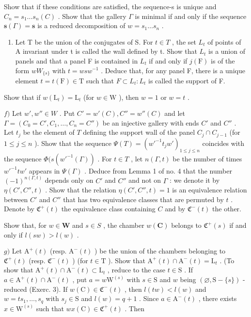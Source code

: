Show that if these conditions are satisfied, the sequence-s is unique and \(C_{n} = s_{1} \ldots s_{n}(C)\) . Show that the gallery \(\Gamma\) is minimal if and only if the sequence \(\mathbf{s}(\Gamma) = \mathbf{s}\) is a reduced decomposition of \(w = s_{1} \ldots s_{n}\) .

\begin{enumerate}
\def\labelenumi{\alph{enumi})}
\setcounter{enumi}{4}
\tightlist
\item
  Let T be the union of the conjugates of S. For \(t \in T\) , the set \(L_{t}\) of points of A invariant under t is called the wall defined by t. Show that \(L_{t}\) is a union of panels and that a panel F is contained in \(L_{t}\) if and only if \(j(\mathrm{F})\) is of the form \(wW_{\{s\}}\) with \(t = wsw^{-1}\) . Deduce that, for any panel F, there is a unique element \(t = t(\mathrm{F}) \in \mathrm{T}\) such that \(F \subset L_{t}: L_{t}\) is called the support of F.
\end{enumerate}

Show that if \(w(\mathrm{L}_t) = \mathrm{L}_t\) (for \(w \in \mathrm{W}\) ), then \(w = 1\) or \(w = t\) .

\(f)\) Let \(w', w'' \in W\) . Put \(C' = w'(C), C'' = w''(C)\) and let \(\Gamma = (C_0 = C', C_1, \ldots, C_n = C'')\) be an injective gallery with ends \(C'\) and \(C''\) . Let \(t_j\) be the element of \(T\) defining the support wall of the panel \(C_j \cap C_{j-1}\) (for \(1 \leqslant j \leqslant n\) ). Show that the sequence \(\Psi(T) = (w'^{-1} t_j w')_{1 \leqslant j \leqslant n}\) coincides with the sequence \(\Phi(s(w'^{-1}(\Gamma))\) . For \(t \in T\) , let \(n(\Gamma, t)\) be the number of times \(w'^{-1} tw'\) appears in \(\Psi(\Gamma)\) . Deduce from Lemma 1 of no. 4 that the number \((-1)^{n(\Gamma, t)}\) depends only on \(C'\) and \(C''\) and not on \(\Gamma\) : we denote it by \(\eta(C', C'', t)\) . Show that the relation \(\eta(C', C'', t) = 1\) is an equivalence relation between \(C'\) and \(C''\) that has two equivalence classes that are permuted by \(t\) . Denote by \(\mathfrak{C}^+(t)\) the equivalence class containing \(C\) and by \(\mathfrak{C}^-(t)\) the other.

Show that, for \(w \in \mathbf{W}\) and \(s \in S\) , the chamber \(w(\mathbf{C})\) belongs to \(\mathfrak{C}^+(s)\) if and only if \(l(sw) > l(w)\) .

\(g)\) Let \(\mathrm{A}^{+}(t)\) (resp. \(\mathrm{A}^{-}(t)\) ) be the union of the chambers belonging to \(\mathfrak{C}^{+}(t)\) (resp. \(\mathfrak{C}^{-}(t)\) ) (for \(t \in \mathrm{T}\) ). Show that \(\mathrm{A}^{+}(t) \cap \mathrm{A}^{-}(t) = \mathrm{L}_{t}\) . (To show that \(\mathrm{A}^{+}(t) \cap \mathrm{A}^{-}(t) \subset \mathrm{L}_{t}\) , reduce to the case \(t \in \mathrm{S}\) . If \(a \in \mathrm{A}^{+}(t) \cap \mathrm{A}^{-}(t)\) , put \(a = w\mathrm{W}^{(s)}\) with \(s \in \mathrm{S}\) and \(w\) being \((\varnothing, \mathrm{S} - \{s\})\) -reduced (Exerc. 3). If \(w(\mathrm{C}) \in \mathfrak{C}^{-}(t)\) , then \(l(tw) < l(w)\) and \(w = ts_{1}, \ldots, s_{q}\) with \(s_{j} \in \mathrm{S}\) and \(l(w) = q + 1\) . Since \(a \in \mathrm{A}^{-}(t)\) , there exists \(x \in \mathrm{W}^{(s)}\) such that \(wx(\mathrm{C}) \in \mathfrak{C}^{+}(t)\) . Then


